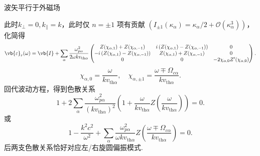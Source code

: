 \begin{example}
	波矢平行于外磁场

	此时\(k_\perp=0, k_{\parallel}=k\)，此时仅 \(n=\pm1\) 项有贡献 \(\left(I_{\pm1}(\kappa_\alpha)=\kappa_\alpha/2+\mathcal{O}(\kappa_\alpha^3)\right)\)，化简得
	\begin{equation*}
		\vb{\varepsilon}_r(\omega) = \vb{I} + \sum_\alpha\frac{\omega_{p\alpha}^2}{2\omega k v_{\mathrm{th}\alpha}}
		\begin{pmatrix}
			Z(\chi_{\alpha,1})+Z(\chi_{\alpha,-1})                & i\left(Z(\chi_{\alpha,1})-Z(\chi_{\alpha,-1})\right) & 0                                    \\
			-i\left(Z(\chi_{\alpha,1})-Z(\chi_{\alpha,-1})\right) & Z(\chi_{\alpha,1})+Z(\chi_{\alpha,-1})               & 0                                    \\
			0                                                     & 0                                                    & -2\chi_{\alpha,0}Z'(\chi_{\alpha,0})
		\end{pmatrix}.
	\end{equation*}
	\begin{equation*}
		\chi_{\alpha,0} = \frac{\omega}{k v_{\mathrm{th}\alpha}},\quad \chi_{\alpha,\pm1} = \frac{\omega\mp\Omega_{c\alpha}}{k v_{\mathrm{th}\alpha}}.
	\end{equation*}
	回代波动方程，得到色散关系
	\begin{equation*}
		1 + 2\sum_\alpha\frac{\omega_{p\alpha}^2}{\left(k v_{\mathrm{th}\alpha}\right)^2}\left(1+\frac{\omega}{k v_{\mathrm{th}\alpha}}Z\left(\frac{\omega}{k v_{\mathrm{th}\alpha}}\right)\right) = 0.
	\end{equation*}
	或
	\begin{equation*}
		1 - \frac{k^2c^2}{\omega^2} + \sum_\alpha\frac{\omega_{p\alpha}^2}{\omega k v_{\mathrm{th}\alpha}}Z\left(\frac{\omega\mp\Omega_{c\alpha}}{k v_{\mathrm{th}\alpha}}\right) = 0.
	\end{equation*}
	后两支色散关系恰好对应左/右旋圆偏振模式.
\end{example}

